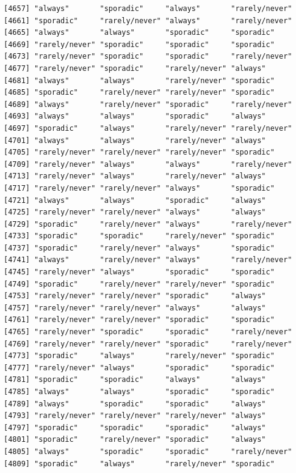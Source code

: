 \documentclass[
  letterpaper,
  DIV=11,
  numbers=noendperiod]{scrartcl}
\begin{document}
\begin{verbatim}
[4657] "always"       "sporadic"     "always"       "rarely/never"
[4661] "sporadic"     "rarely/never" "always"       "rarely/never"
[4665] "always"       "always"       "sporadic"     "sporadic"    
[4669] "rarely/never" "sporadic"     "sporadic"     "sporadic"    
[4673] "rarely/never" "sporadic"     "sporadic"     "rarely/never"
[4677] "rarely/never" "sporadic"     "rarely/never" "always"      
[4681] "always"       "always"       "rarely/never" "sporadic"    
[4685] "sporadic"     "rarely/never" "rarely/never" "sporadic"    
[4689] "always"       "rarely/never" "sporadic"     "rarely/never"
[4693] "always"       "always"       "sporadic"     "always"      
[4697] "sporadic"     "always"       "rarely/never" "rarely/never"
[4701] "always"       "always"       "rarely/never" "always"      
[4705] "rarely/never" "rarely/never" "rarely/never" "sporadic"    
[4709] "rarely/never" "always"       "always"       "rarely/never"
[4713] "rarely/never" "always"       "rarely/never" "always"      
[4717] "rarely/never" "rarely/never" "always"       "sporadic"    
[4721] "always"       "always"       "sporadic"     "always"      
[4725] "rarely/never" "rarely/never" "always"       "always"      
[4729] "sporadic"     "rarely/never" "always"       "rarely/never"
[4733] "sporadic"     "sporadic"     "rarely/never" "sporadic"    
[4737] "sporadic"     "rarely/never" "always"       "sporadic"    
[4741] "always"       "rarely/never" "always"       "rarely/never"
[4745] "rarely/never" "always"       "sporadic"     "sporadic"    
[4749] "sporadic"     "rarely/never" "rarely/never" "sporadic"    
[4753] "rarely/never" "rarely/never" "sporadic"     "always"      
[4757] "rarely/never" "rarely/never" "always"       "always"      
[4761] "rarely/never" "rarely/never" "sporadic"     "sporadic"    
[4765] "rarely/never" "sporadic"     "sporadic"     "rarely/never"
[4769] "rarely/never" "rarely/never" "sporadic"     "rarely/never"
[4773] "sporadic"     "always"       "rarely/never" "sporadic"    
[4777] "rarely/never" "always"       "sporadic"     "sporadic"    
[4781] "sporadic"     "sporadic"     "always"       "always"      
[4785] "always"       "always"       "sporadic"     "sporadic"    
[4789] "always"       "sporadic"     "sporadic"     "always"      
[4793] "rarely/never" "rarely/never" "rarely/never" "always"      
[4797] "sporadic"     "sporadic"     "sporadic"     "always"      
[4801] "sporadic"     "rarely/never" "sporadic"     "always"      
[4805] "always"       "sporadic"     "sporadic"     "rarely/never"
[4809] "sporadic"     "always"       "rarely/never" "sporadic"    

\end{verbatim}
\end{document}
